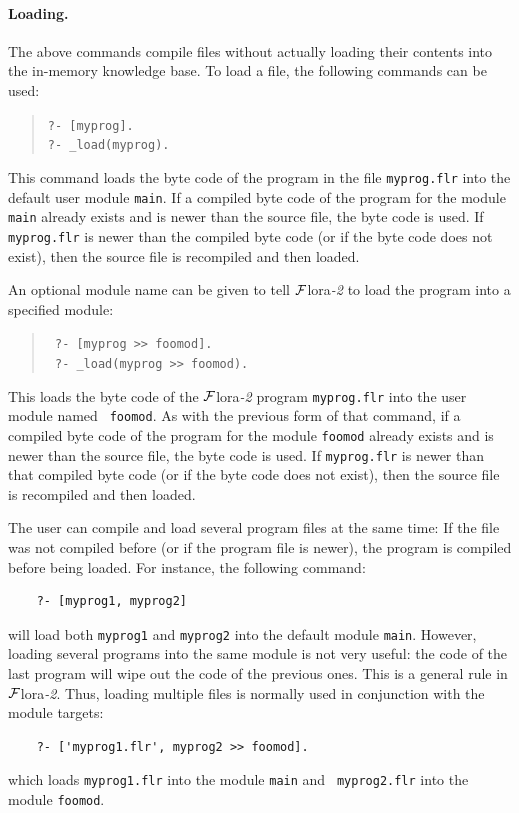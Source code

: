 \documentclass[11pt]{article}
\newcommand{\FLORA}{{\mbox{\sc ${\cal F}${lora}\rm\emph{-2}}}\xspace}
\begin{document}
\paragraph{Loading.}
%
The above commands compile files without actually loading their contents
into the in-memory knowledge base. 
To load a file, the following commands can be used:
\index{\tt [file]}
\begin{quote}
 \tt ?- [myprog].  
 \\
 \tt ?- \_load(myprog).
\end{quote}
This command loads the byte code of the program in the file {\tt myprog.flr} into the default user
module {\tt main}. If a compiled byte code of the program for the module
{\tt main} already exists and is newer than the source file, the byte code
is used.  If {\tt myprog.flr} is newer than the compiled byte code (or if
the byte code does not exist), then
the source file is recompiled and then loaded.

An optional module name can be given to tell \FLORA to
load the program into a specified module:
\begin{quote}
  \tt
    ?- [myprog >> foomod].\\
    \tt
    ?- \_load(myprog >> foomod).
\end{quote}
This loads the byte code of the \FLORA program {\tt myprog.flr} into the user module named {\tt
  foomod}. As with the previous form of that command, if a compiled byte code of the program for the module
{\tt foomod} already exists and is newer than the source file, the byte code
is used.  If {\tt myprog.flr} is newer than that compiled byte code (or if
the byte code does not exist), then
the source file is recompiled and then loaded.

The user can compile and load several program
files at the same time: If the file was not compiled before (or if the
program file is newer), the program is compiled before being loaded.
For instance, the following command:
\begin{verbatim}
    ?- [myprog1, myprog2]
\end{verbatim}
will load both {\tt myprog1} and {\tt myprog2} into the default module
{\tt main}. However, loading several programs into the same module is not
very useful: the code of the last program will wipe out the code of the
previous ones. This is a general rule in \FLORA. Thus, loading
multiple files is normally used in conjunction with the module targets:
\begin{verbatim}
    ?- ['myprog1.flr', myprog2 >> foomod].
\end{verbatim}
which loads {\tt myprog1.flr} into the module {\tt main} and {\tt
  myprog2.flr} into the module {\tt foomod}.
\end{document}
